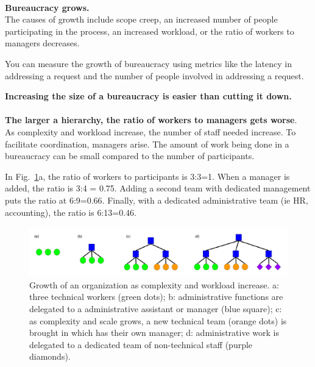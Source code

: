 \ \\

\textbf{Bureaucracy grows.}\\
The causes of growth include
scope creep, an increased number of people participating in the process, an increased workload, or the ratio of workers to managers decreases. 

You can measure the growth of bureaucracy using metrics like the latency in addressing a request and 
the number of people involved in addressing a request.  

\textbf{Increasing the size of a bureaucracy is easier than cutting it down.}\\
\ \\

\textbf{The larger a hierarchy, the ratio of workers to managers gets worse}. \\

As complexity and workload increase, the number of staff needed increase. To facilitate coordination, managers arise. The amount of work being done in a bureaucracy can be small compared to the number of participants.

In Fig.~\ref{fig:growth_of_bureaucracy}a, the ratio of workers to participants is 3:3=1. When a manager is added, the ratio is 3:4 = 0.75. Adding a second team with dedicated management puts the ratio at 6:9=0.66. Finally, with a dedicated administrative team (ie HR, accounting), the ratio is 6:13=0.46.

    \begin{figure}
        \centering
        \includegraphics[width=1\textwidth]{images/growth-of-bureaucracy.pdf}
        \caption{Growth of an organization as complexity and workload increase. a: three technical workers (green dots); b: administrative functions are delegated to a administrative assistant or manager (blue square); c: as complexity and scale grows, a new technical team (orange dots) is brought in which has their own manager; d: administrative work is delegated to a dedicated team of non-technical staff (purple diamonds).}
        \label{fig:growth_of_bureaucracy}
    \end{figure}

